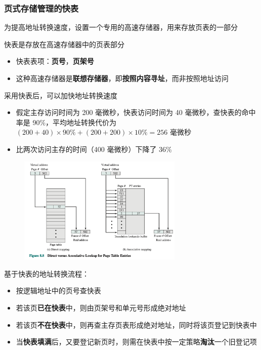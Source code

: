 \documentclass[cs4size,a4paper,10pt]{ctexart}
\begin{document}
		\subsubsection{页式存储管理的快表}
		为提高地址转换速度，设置一个专用的高速存储器，用来存放页表的一部分

		快表是存放在高速存储器中的页表部分

		\begin{itemize}
			\item 快表表项：\textbf{页号}，\textbf{页架号}
			\item 这种高速存储器是\textbf{联想存储器}，即\textbf{按照内容寻址}，而非按照地址访问
		\end{itemize}

		采用快表后，可以加快地址转换速度
		\begin{itemize}
			\item 假定主存访问时间为 200 毫微秒，快表访问时间为 40 毫微秒，查快表的命中率是 90\%，平均地址转换代价为 $(200+40)\times 90\%+(200+200)\times 10\% = 256$ 毫微秒
			\item 比两次访问主存的时间（400 毫微秒）下降了 36\%
		\end{itemize}

		\begin{figure}[H]
			\centering
			\includegraphics[width=0.7\textwidth]{img/3.3.2.2}
		\end{figure}

		基于快表的地址转换流程：
		\begin{itemize}
			\item 按逻辑地址中的页号查快表
			\item 若该页\textbf{已在快表}中，则由页架号和单元号形成绝对地址
			\item 若该页\textbf{不在快表}中，则再查主存页表形成绝对地址，同时将该页登记到快表中
			\item 当\textbf{快表填满}后，又要登记新页时，则需在快表中按一定策略\textbf{淘汰}一个旧登记项
		\end{itemize}
\end{document}
